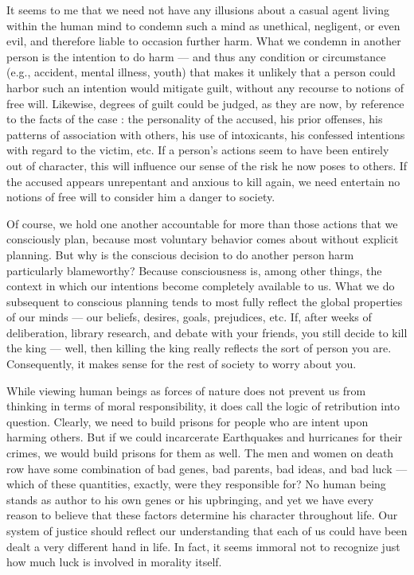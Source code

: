 \documentclass[a4paper,14pt]{extbook}
\begin{document}
It seems to me that we need not have any illusions about a casual agent living within the human mind to condemn such a mind as unethical, negligent, or even evil, and therefore liable to occasion further harm.
What we condemn in another person is the intention to do harm --- and thus any condition or circumstance (e.g., accident, mental illness, youth) that makes it unlikely that a person could harbor such an intention would mitigate guilt, without any recourse to notions of free will.
Likewise, degrees of guilt could be judged, as they are now, by reference to the facts of the case :
the personality of the accused, his prior offenses, his patterns of association with others, his use of intoxicants, his confessed intentions with regard to the victim, etc.
If a person’s actions seem to have been entirely out of character, this will influence our sense of the risk he now poses to others.
If the accused appears unrepentant and anxious to kill again, we need entertain no notions of free will to consider him a danger to society.

Of course, we hold one another accountable for more than those actions that we consciously plan, because most voluntary behavior comes about without explicit planning.
But why is the conscious decision to do another person harm particularly blameworthy?
Because consciousness is, among other things, the context in which our intentions become completely available to us.
What we do subsequent to conscious planning tends to most fully reflect the global properties of our minds --- our beliefs, desires, goals, prejudices, etc.
If, after weeks of deliberation, library research, and debate with your friends, you still decide to kill the king --- well, then killing the king really reflects the sort of person you are.
Consequently, it makes sense for the rest of society to worry about you.

While viewing human beings as forces of nature does not prevent us from thinking in terms of moral responsibility, it does call the logic of retribution into question.
Clearly, we need to build prisons for people who are intent upon harming others.
But if we could incarcerate Earthquakes and hurricanes for their crimes, we would build prisons for them as well.
The men and women on death row have some combination of bad genes, bad parents, bad ideas, and bad luck --- which of these quantities, exactly, were they responsible for?
No human being stands as author to his own genes or his upbringing, and yet we have every reason to believe that these factors determine his character throughout life.
Our system of justice should reflect our understanding that each of us could have been dealt a very different hand in life.
In fact, it seems immoral not to recognize just how much luck is involved in morality itself.
\end{document}
